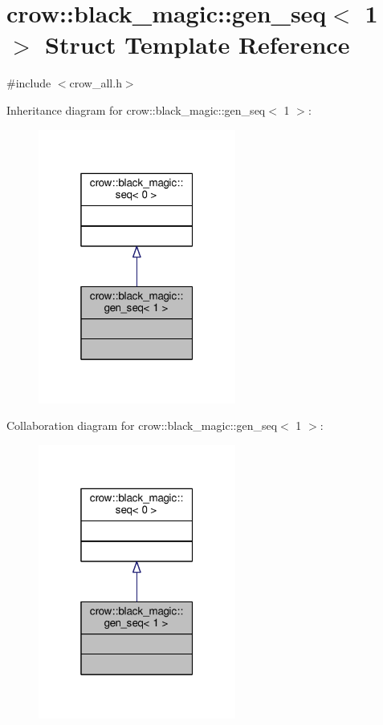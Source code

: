 \hypertarget{structcrow_1_1black__magic_1_1gen__seq_3_011_01_4}{\section{crow\-:\-:black\-\_\-magic\-:\-:gen\-\_\-seq$<$ 1 $>$ Struct Template Reference}
\label{structcrow_1_1black__magic_1_1gen__seq_3_011_01_4}
}


{\ttfamily \#include $<$crow\-\_\-all.\-h$>$}



Inheritance diagram for crow\-:\-:black\-\_\-magic\-:\-:gen\-\_\-seq$<$ 1 $>$\-:
\nopagebreak
\begin{figure}[H]
\begin{center}
\leavevmode
\includegraphics[width=184pt]{structcrow_1_1black__magic_1_1gen__seq_3_011_01_4__inherit__graph}
\end{center}
\end{figure}


Collaboration diagram for crow\-:\-:black\-\_\-magic\-:\-:gen\-\_\-seq$<$ 1 $>$\-:
\nopagebreak
\begin{figure}[H]
\begin{center}
\leavevmode
\includegraphics[width=184pt]{structcrow_1_1black__magic_1_1gen__seq_3_011_01_4__coll__graph}
\end{center}
\end{figure}
